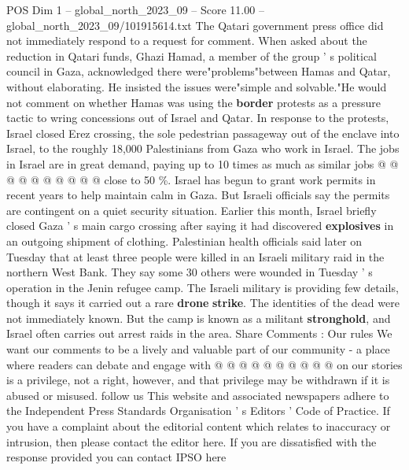 \begin{textsample}{POS Dim 1 – global\_north\_2023\_09 – Score 11.00 – global\_north\_2023\_09/101915614.txt}
The Qatari government press office did not immediately respond to a request for comment.
When asked about the reduction in Qatari funds, Ghazi Hamad, a member of the group ' s political council in Gaza, acknowledged there were"problems"between Hamas and Qatar, without elaborating.
He insisted the issues were"simple and solvable."He would not comment on whether Hamas was using the \textbf{border} protests as a pressure tactic to wring concessions out of Israel and Qatar.
In response to the protests, Israel closed Erez crossing, the sole pedestrian passageway out of the enclave into Israel, to the roughly 18,000 Palestinians from Gaza who work in Israel.
The jobs in Israel are in great demand, paying up to 10 times as much as similar jobs @ @ @ @ @ @ @ @ @ @ close to 50 \%.
Israel has begun to grant work permits in recent years to help maintain calm in Gaza.
But Israeli officials say the permits are contingent on a quiet security situation.
Earlier this month, Israel briefly closed Gaza ' s main cargo crossing after saying it had discovered \textbf{explosives} in an outgoing shipment of clothing.
Palestinian health officials said later on Tuesday that at least three people were killed in an Israeli military raid in the northern West Bank.
They say some 30 others were wounded in Tuesday ' s operation in the Jenin refugee camp.
The Israeli military is providing few details, though it says it carried out a rare \textbf{drone} \textbf{strike}.
The identities of the dead were not immediately known.
But the camp is known as a militant \textbf{stronghold}, and Israel often carries out arrest raids in the area.
Share Comments : Our rules We want our comments to be a lively and valuable part of our community - a place where readers can debate and engage with @ @ @ @ @ @ @ @ @ @ on our stories is a privilege, not a right, however, and that privilege may be withdrawn if it is abused or misused. follow us This website and associated newspapers adhere to the Independent Press Standards Organisation ' s Editors ' Code of Practice.
If you have a complaint about the editorial content which relates to inaccuracy or intrusion, then please contact the editor here.
If you are dissatisfied with the response provided you can contact IPSO here

\end{textsample}
